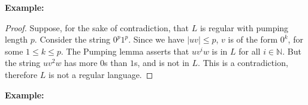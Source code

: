 


\textbf{Example:} 

\begin{proof}
	
	Suppose, for the sake of contradiction, that $L$ is regular with pumping length $p$.  Consider the string $0^p 1^p$. Since we have $|uv| \leq p$, $v$ is of the form $0^k$, for some $1\leq k\leq p$.  The Pumping lemma asserts that $uv^iw$ is in $L$ for all $i\in \mathbb{N}$.  But the string $uv^2w$ has more $0$s than $1$s, and is not in $L$.  This is a contradiction, therefore $L$ is not a regular language.
	
	
\end{proof}






\textbf{Example:} 

